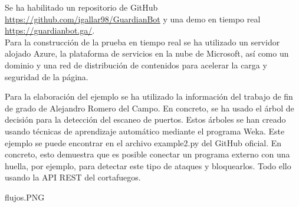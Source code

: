 Se ha habilitado un repositorio de GitHub \url{https://github.com/igallar98/GuardianBot} y una demo en tiempo real \url{https://guardianbot.ga/}.
\\Para la construcción de la prueba en tiempo real se ha utilizado un servidor alojado Azure, la plataforma de servicios en la nube de Microsoft, así como un dominio y una red de distribución de contenidos para acelerar la carga y seguridad de la página. 

Para la elaboración del ejemplo se ha utilizado la información del trabajo de fin de grado de Alejandro Romero del Campo. En concreto, se ha usado el árbol de decisión para la detección del escaneo de puertos. Estos árboles se han creado usando técnicas de aprendizaje automático mediante el programa Weka. Este ejemplo se puede encontrar en el archivo example2.py del GitHub oficial. En concreto, esto demuestra que es posible conectar un programa externo con una huella, por ejemplo, para detectar este tipo de ataques y bloquearlos. Todo ello usando la API REST del cortafuegos.
\begin{center}
\begin{image}{}{}{flujos.PNG}
\end{image}
\end{center}
